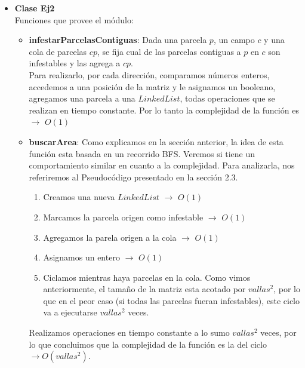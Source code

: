 \begin{itemize}
\item \textbf{Clase Ej2}\\
\indent Funciones que provee el módulo:
\begin{itemize}
 \item \textbf{infestarParcelasContiguas}: Dada una parcela $p$, un campo $c$ y
una cola de parcelas $cp$, se fija cual de las parcelas contiguas a $p$ en $c$
son infestables y las agrega a $cp$. \\
Para realizarlo, por cada dirección, comparamos números enteros, accedemos a una
posición de la matriz y le asignamos un booleano, agregamos una parcela a una
$LinkedList$, todas operaciones que se realizan en tiempo constante. Por lo
tanto la complejidad de la función es $\rightarrow$ $O(1)$
\item \textbf{buscarArea}: Como explicamos en la sección anterior, la idea de
esta función esta basada en un recorrido BFS. Veremos si tiene un
comportamiento similar en cuanto a la complejidad. Para analizarla, nos
referiremos al Pseudocódigo presentado en la sección 2.3.
\begin{enumerate}
 \item Creamos una nueva $LinkedList$ $\rightarrow$ $O(1)$
 \item Marcamos la parcela origen como infestable $\rightarrow$ $O(1)$
 \item Agregamos la parela origen a la cola $\rightarrow$ $O(1)$
 \item Asignamos un entero $\rightarrow$ $O(1)$
 \item Ciclamos mientras haya parcelas en la cola. Como vimos anteriormente, el
tamaño de la matriz esta acotado por $vallas^2$, por lo que en el peor caso (si todas las parcelas fueran infestables),
este ciclo va a ejecutarse $vallas^2$ veces.
\end{enumerate}

Realizamos operaciones en tiempo constante a lo sumo $vallas^2$ veces, por lo
que concluimos que la complejidad de la función es la del ciclo $\rightarrow O(vallas^2)$.


\end{itemize}
\end{itemize}
